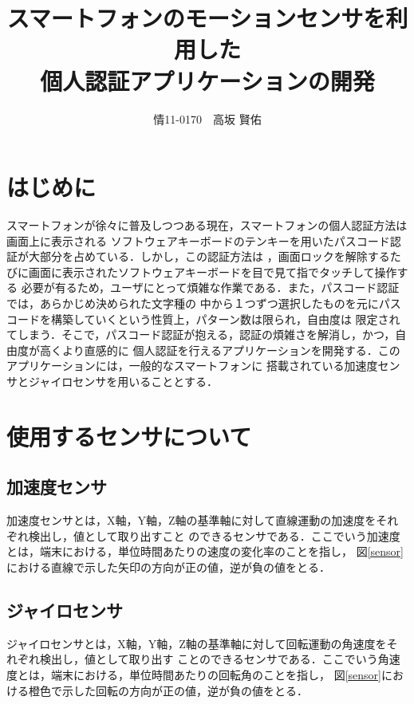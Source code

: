 \documentclass[11pt]{jreport}
\title{\bfseries スマートフォンのモーションセンサを利用した\\個人認証アプリケーションの開発}
\author{情11-0170　高坂 賢佑}
\date{}
\begin{document}
\maketitle

\tableofcontents
\listoffigures

\chapter*{はじめに}
スマートフォンが徐々に普及しつつある現在，スマートフォンの個人認証方法は画面上に表示される
ソフトウェアキーボードのテンキーを用いたパスコード認証が大部分を占めている．しかし，この認証方法は
，画面ロックを解除するたびに画面に表示されたソフトウェアキーボードを目で見て指でタッチして操作する
必要が有るため，ユーザにとって煩雑な作業である．また，パスコード認証では，あらかじめ決められた文字種の
中から１つずつ選択したものを元にパスコードを構築していくという性質上，パターン数は限られ，自由度は
限定されてしまう．そこで，パスコード認証が抱える，認証の煩雑さを解消し，かつ，自由度が高くより直感的に
個人認証を行えるアプリケーションを開発する．このアプリケーションには，一般的なスマートフォンに
搭載されている加速度センサとジャイロセンサを用いることとする．

\chapter{使用するセンサについて}
	\section{加速度センサ}
	加速度センサとは，X軸，Y軸，Z軸の基準軸に対して直線運動の加速度をそれぞれ検出し，値として取り出すこと
	のできるセンサである．ここでいう加速度とは，端末における，単位時間あたりの速度の変化率のことを指し，
	図\ref{sensor}における直線で示した矢印の方向が正の値，逆が負の値をとる．
	
	\section{ジャイロセンサ}
	ジャイロセンサとは，X軸，Y軸，Z軸の基準軸に対して回転運動の角速度をそれぞれ検出し，値として取り出す
	ことのできるセンサである．ここでいう角速度とは，端末における，単位時間あたりの回転角のことを指し，
	図\ref{sensor}における橙色で示した回転の方向が正の値，逆が負の値をとる．
\end{document}
